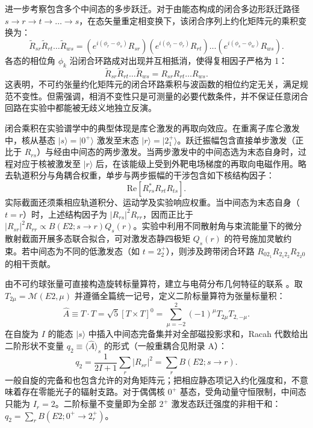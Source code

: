 进一步考察包含多个中间态的多步跃迁。对于由能态构成的闭合多边形跃迁路径 $s \to r \to t \to \dots \to s$，在态矢量重定相变换下，该闭合序列上约化矩阵元的乘积变换为：
\begin{equation}\label{eq:2-1-22}
\tilde{R}_{sr} \tilde{R}_{rt} \dots \tilde{R}_{ws} = \left(e^{i(\phi_r - \phi_s)} R_{sr}\right) \left(e^{i(\phi_t - \phi_r)} R_{rt}\right) \dots \left(e^{i(\phi_s - \phi_w)} R_{ws}\right).
\end{equation}
各态的相位角 $\phi_k$ 沿闭合环路成对出现并互相抵消，使得复相因子严格为 1：
\begin{equation}\label{eq:2-1-23}
\tilde{R}_{sr} \tilde{R}_{rt} \dots \tilde{R}_{ws} = R_{sr} R_{rt} \dots R_{ws}.
\end{equation}
这表明，不可约张量约化矩阵元的闭合环路乘积与波函数的相位约定无关，满足规范不变性。但需强调，相消不变性只是可测量的必要代数条件，并不保证任意闭合回路在实验中都能被无歧义地独立反演。

闭合乘积在实验谱学中的典型体现是库仑激发的再取向效应。在重离子库仑激发中，核从基态 $|s\rangle = |0^+\rangle$ 激发至末态 $|r\rangle = |2_1^+\rangle$。跃迁振幅包含直接单步激发（正比于 $R_{rs}$）与经由中间态的两步激发。当两步激发中的中间态选为末态自身时，过程对应于核被激发至 $|r\rangle$ 后，在该能级上受到外靶电场梯度的再取向电磁作用。略去轨道积分与角耦合权重，单步与两步振幅的干涉包含如下核结构因子：
\begin{equation}\label{eq:2-1-24}
\mathrm{Re} \left[ R_{rs}^* R_{rt} R_{ts} \right].
\end{equation}
实际截面还须乘相应轨道积分、运动学及实验响应权重。当中间态为末态自身（$t = r$）时，上述结构因子为 $|R_{rs}|^2 R_{rr}$，因而正比于 $|R_{sr}|^2 R_{rr} \propto B(E2; s \to r) Q_s(r)$。实验中利用不同散射角与束流能量下的微分散射截面开展多态联合拟合，可对激发态静四极矩 $Q_s(r)$ 的符号施加灵敏约束。若中间态为不同的低激发态（如 $t = 2_2^+$），则涉及跨带闭合环路 $R_{0 2_1} R_{2_1 2_2} R_{2_2 0}$ 的相干贡献。

由不可约球张量可直接构造旋转标量算符，建立与电荷分布几何特征的联系 \cite{cline-1986-nuclear-shapes-coulomb-excitation}。取 $T_{2\mu}=\mathcal M(E2,\mu)$ 并遵循全篇统一记号，定义二阶标量算符为张量标量积：
\begin{equation}\label{eq:2-1-25}
\hat{A} \equiv T \cdot T = \sqrt{5} [T \times T]^0 = \sum_{\mu=-2}^2 (-1)^\mu T_{2\mu} T_{2, -\mu}.
\end{equation}
在自旋为 $I$ 的能态 $|s\rangle$ 中插入中间态完备集并对全部磁投影求和，Racah 代数给出二阶形状不变量 $q_2 \equiv \langle \hat{A} \rangle_s$ 的形式（一般重耦合见附录 A）：
\begin{equation}\label{eq:2-1-26}
q_2 = \frac{1}{2I+1} \sum_r |R_{sr}|^2 = \sum_r B(E2; s \to r).
\end{equation}
一般自旋的完备和也包含允许的对角矩阵元；把相应静态项记入约化强度和，不意味着存在零能光子的辐射支路。对于偶偶核 $0^+$ 基态，受角动量守恒限制，中间态只能为 $I_r = 2$。二阶标量不变量即为全部 $2^+$ 激发态跃迁强度的非相干和：$q_2 = \sum_r B(E2; 0^+ \to 2_r^+)$。

